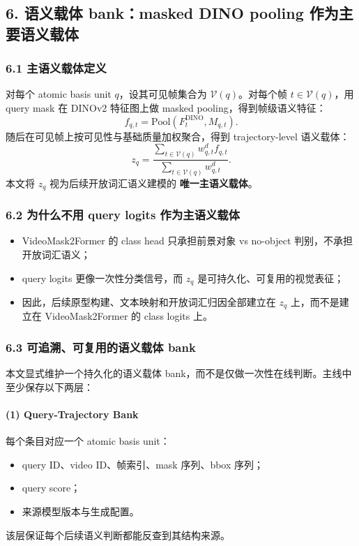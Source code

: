 \documentclass[UTF8]{ctexart}
\begin{document}
\subsection*{6. 语义载体 bank：masked DINO pooling 作为主要语义载体}

\subsubsection*{6.1 主语义载体定义}
对每个 atomic basis unit $q$，设其可见帧集合为 $\mathcal V(q)$。对每个帧 $t\in \mathcal V(q)$，用 query mask 在 DINOv2 特征图上做 masked pooling，得到帧级语义特征：
\[
 f_{q,t} = \mathrm{Pool}(F_t^{\mathrm{DINO}}, M_{q,t}).
\]
随后在可见帧上按可见性与基础质量加权聚合，得到 trajectory-level 语义载体：
\[
 z_q = \frac{\sum_{t\in \mathcal V(q)} w_{q,t}^{d} f_{q,t}}{\sum_{t\in \mathcal V(q)} w_{q,t}^{d}}.
\]
本文将 $z_q$ 视为后续开放词汇语义建模的 \textbf{唯一主语义载体}。

\subsubsection*{6.2 为什么不用 query logits 作为主语义载体}
\begin{itemize}
\item VideoMask2Former 的 class head 只承担前景对象 vs no-object 判别，不承担开放词汇语义；
\item query logits 更像一次性分类信号，而 $z_q$ 是可持久化、可复用的视觉表征；
\item 因此，后续原型构建、文本映射和开放词汇归因全部建立在 $z_q$ 上，而不是建立在 VideoMask2Former 的 class logits 上。
\end{itemize}

\subsubsection*{6.3 可追溯、可复用的语义载体 bank}
本文显式维护一个持久化的语义载体 bank，而不是仅做一次性在线判断。主线中至少保存以下两层：

\paragraph{(1) Query-Trajectory Bank}
每个条目对应一个 atomic basis unit：
\begin{itemize}
\item query ID、video ID、帧索引、mask 序列、bbox 序列；
\item query score；
\item 来源模型版本与生成配置。
\end{itemize}
该层保证每个后续语义判断都能反查到其结构来源。
\end{document}
